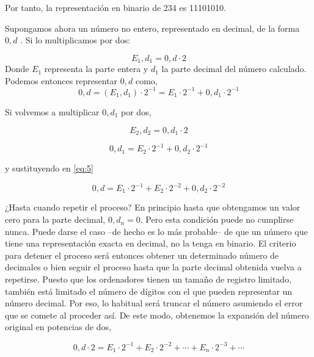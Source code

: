  Por tanto, la representación en binario de 234 es 11101010.
 
Supongamos ahora un número no entero, representado en decimal, de la forma $0,d$ . Si lo multiplicamos por dos:

\begin{equation}
E_1,d_1=0,d\cdot 2
\end{equation}
Donde $E_1$ representa la parte entera y $d_1$ la parte decimal del número calculado.
Podemos entonces representar $0,d$ como,
\begin{equation}
\label{eq:5}
0,d=(E_1,d_1)\cdot 2^{-1}=E_1\cdot 2^{-1}+0,d_1\cdot 2^{-1}
\end{equation}  

Si volvemos a multiplicar $0,d_1$ por dos,

\begin{equation}
E_2,d_2 = 0,d_1\cdot 2
\end{equation}

\begin{equation}
0,d_1=E_2\cdot 2^{-1}+0,d_2\cdot 2^{-1}
\end{equation}  

y sustituyendo en \ref{eq:5}

\begin{equation}
0,d=E_1\cdot 2^{-1}+E_2\cdot 2^{-2}+0,d_2\cdot 2^{-2}
\end{equation}

¿Hasta cuando repetir el proceso? En principio hasta que obtengamos un valor cero para la parte decimal, $0,d_n=0$. Pero esta condición puede no cumplirse nunca. Puede darse el caso --de hecho es lo más probable-- de que un número que tiene una representación exacta en decimal, no la tenga en binario. El criterio para detener el proceso será entonces obtener un determinado número de decimales o bien seguir el proceso hasta que la parte decimal obtenida vuelva a repetirse. Puesto que los ordenadores tienen un tamaño de registro limitado, también está limitado el número de dígitos con el que pueden representar un número decimal. Por eso, lo habitual será truncar el número asumiendo el error que se comete al proceder así.  De este modo, obtenemos la expansión del número original en potencias de dos,

\begin{equation}
0,d\cdot 2=E_1\cdot 2^{-1}+E_2\cdot 2^{-2}+\cdots+ E_n\cdot 2^{-3}+\cdots
\end{equation} 

